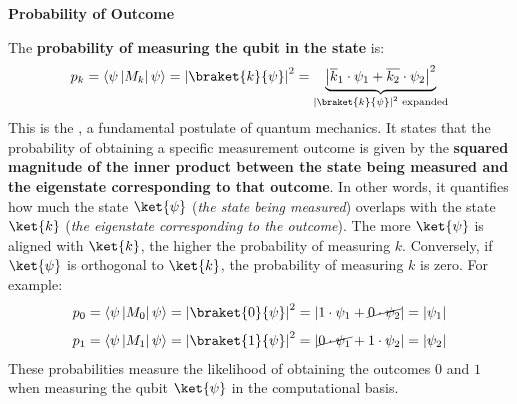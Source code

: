 \highspace
\begin{flushleft}
  \textcolor{Green3}{ \textbf{Probability of Outcome}}
\end{flushleft}
The \textbf{probability of measuring the qubit in the state}  is:
\begin{equation}\label{eq:born-rule}
  p_{k} = \left\langle \psi \left| M_{k} \right| \psi \right\rangle = \left|\braket{k}{\psi}\right|^{2} =
  \underbrace{\left| \overline{k}_{1} \cdot \psi_{1} + \overline{k_{2}} \cdot \psi_{2} \right|^{2}}_{\left|\braket{k}{\psi}\right|^{2} \text{ expanded}}
\end{equation}
This is the , a fundamental postulate of quantum mechanics. It states that the probability of obtaining a specific measurement outcome is given by the \textbf{squared magnitude of the inner product between the state being measured and the eigenstate corresponding to that outcome}. In other words, it quantifies how much the state $\ket{\psi}$ (\emph{the state being measured}) overlaps with the state $\ket{k}$ (\emph{the eigenstate corresponding to the outcome}). The more $\ket{\psi}$ is aligned with $\ket{k}$, the higher the probability of measuring $k$. Conversely, if $\ket{\psi}$ is orthogonal to $\ket{k}$, the probability of measuring $k$ is zero. For example:
\begin{equation*}
  \begin{aligned}
    p_{0} &= \left\langle \psi \left|M_{0}\right| \psi \right\rangle = \left|\braket{0}{\psi}\right|^{2} = \left|1 \cdot \psi_{1} + \cancel{0 \cdot \psi_{2}} \right| = \left|\psi_{1}\right| \\[.3em]
    p_{1} &= \left\langle \psi \left|M_{1}\right| \psi \right\rangle = \left|\braket{1}{\psi}\right|^{2} = \left|\cancel{0 \cdot \psi_{1}} + 1 \cdot \psi_{2} \right| = \left|\psi_{2}\right|
  \end{aligned}
\end{equation*}
These probabilities measure the likelihood of obtaining the outcomes $0$ and $1$ when measuring the qubit $\ket{\psi}$ in the computational basis.

